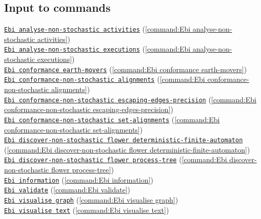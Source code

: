 {\subsection*{Input to commands} \null\qquad\hyperref[command:Ebi analyse-non-stochastic activities]{\texttt{Ebi analyse-non-stochastic activities}} (\cref{command:Ebi analyse-non-stochastic activities})\\\null\qquad\hyperref[command:Ebi analyse-non-stochastic executions]{\texttt{Ebi analyse-non-stochastic executions}} (\cref{command:Ebi analyse-non-stochastic executions})\\\null\qquad\hyperref[command:Ebi conformance earth-movers]{\texttt{Ebi conformance earth-movers}} (\cref{command:Ebi conformance earth-movers})\\\null\qquad\hyperref[command:Ebi conformance-non-stochastic alignments]{\texttt{Ebi conformance-non-stochastic alignments}} (\cref{command:Ebi conformance-non-stochastic alignments})\\\null\qquad\hyperref[command:Ebi conformance-non-stochastic escaping-edges-precision]{\texttt{Ebi conformance-non-stochastic escaping-edges-precision}} (\cref{command:Ebi conformance-non-stochastic escaping-edges-precision})\\\null\qquad\hyperref[command:Ebi conformance-non-stochastic set-alignments]{\texttt{Ebi conformance-non-stochastic set-alignments}} (\cref{command:Ebi conformance-non-stochastic set-alignments})\\\null\qquad\hyperref[command:Ebi discover-non-stochastic flower deterministic-finite-automaton]{\texttt{Ebi discover-non-stochastic flower deterministic-finite-automaton}} (\cref{command:Ebi discover-non-stochastic flower deterministic-finite-automaton})\\\null\qquad\hyperref[command:Ebi discover-non-stochastic flower process-tree]{\texttt{Ebi discover-non-stochastic flower process-tree}} (\cref{command:Ebi discover-non-stochastic flower process-tree})\\\null\qquad\hyperref[command:Ebi information]{\texttt{Ebi information}} (\cref{command:Ebi information})\\\null\qquad\hyperref[command:Ebi validate]{\texttt{Ebi validate}} (\cref{command:Ebi validate})\\\null\qquad\hyperref[command:Ebi visualise graph]{\texttt{Ebi visualise graph}} (\cref{command:Ebi visualise graph})\\\null\qquad\hyperref[command:Ebi visualise text]{\texttt{Ebi visualise text}} (\cref{command:Ebi visualise text})
}
